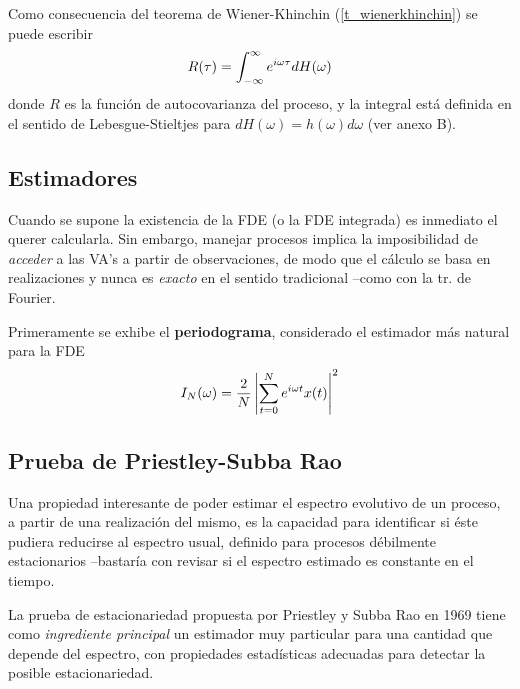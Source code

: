 Como consecuencia del teorema de Wiener-Khinchin (\ref{t_wienerkhinchin}) 
se puede escribir
\begin{equation*}
R(\tau) = \int_{-\infty}^{\infty} e^{i \omega \tau} dH(\omega)
\end{equation*}
donde $R$ es la función de autocovarianza del proceso, y la integral está definida en el sentido
de Lebesgue-Stieltjes para $dH(\omega) = h(\omega) d\omega$ (ver anexo B).


\subsection{Estimadores}

Cuando se supone la existencia de la FDE (o la FDE integrada) es inmediato el querer calcularla.
Sin embargo, manejar procesos implica la imposibilidad de \textit{acceder} a las VA's a partir de 
observaciones, de modo que el cálculo se basa en realizaciones y nunca es \textit{exacto} en el
sentido tradicional --como con la tr. de Fourier.

Primeramente se exhibe el \textbf{periodograma}, considerado el estimador más natural para la FDE
\begin{equation*}
I_N(\omega) = \frac{2}{N} \left| \sum_{t = 0}^{N} e^{i \omega t} x(t) \right|^{2}
\end{equation*}

\subsection{Prueba de Priestley-Subba Rao}

Una propiedad interesante de poder estimar el espectro evolutivo de un proceso, a partir de una 
realización del mismo, es la capacidad para identificar si éste pudiera reducirse al espectro 
usual, definido para procesos débilmente estacionarios --bastaría con revisar si el espectro 
estimado es constante en el tiempo.

La prueba de estacionariedad propuesta por Priestley y Subba Rao en 1969 \cite{Priestley69} tiene 
como \textit{ingrediente principal} un estimador muy particular para una cantidad que depende del 
espectro, con propiedades estadísticas adecuadas para detectar la posible estacionariedad.

